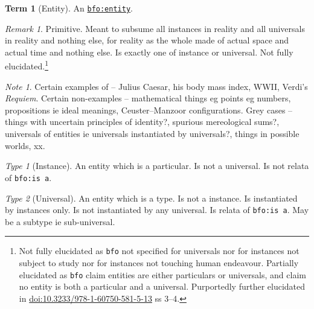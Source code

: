 \documentclass{amsart}%
\newcommand{\code}[1]{\texttt{#1}}%
\newcommand{\titleit}[1]{\textit{#1}}%
\theoremstyle{plain}
\theoremstyle{definition}
\theoremstyle{remark}
\newtheorem*{note}{Note}
\theoremstyle{definition}
\newtheorem{term}{Term}[subsection]%
\theoremstyle{remark}
\newtheorem*{term-type}{Type}
\newtheorem*{term-note}{Remark}
\begin{document}
\begin{term}[Entity]
\label{term:entity}
An \href{http://purl.obolibrary.org/obo/BFO_0000001}{\code{bfo:entity}}.
\begin{term-note}
Primitive. Meant to subsume all instances in reality %
and all universals in reality and nothing else, for reality as the whole made of actual space and actual time and nothing else. Is exactly one of instance or universal. Not fully elucidated.\footnote{Not fully elucidated as \code{bfo} not specified for universals nor for instances not subject to study nor for instances not touching human endeavour. %
%
%
Partially elucidated as \code{bfo} claim entities are either particulars or universals, and claim no entity is both a particular and a universal. Purportedly further elucidated in \href{https://doi.org/10.3233/978-1-60750-581-5-13}{doi:10.3233/978-1-60750-581-5-13} ss 3--4.}
\end{term-note}
\begin{note}
Certain examples of -- Julius Caesar, his body mass index, WWII, Verdi's \titleit{Requiem}. Certain non-examples -- mathematical things eg points eg numbers, propositions ie ideal meanings, Ceuster--Manzoor configurations. Grey cases -- things with uncertain principles of identity?, spurious mereological sums?, universals of entities ie universals instantiated by universals?, things in possible worlds, xx.%
\end{note}
\begin{term-type}[Instance]
An entity which is a particular. Is not a universal. Is not relata of \code{bfo:is a}.
\end{term-type}
\begin{term-type}[Universal]
An entity which is a type. Is not a instance. Is instantiated by instances only. Is not instantiated by any universal. Is relata of \code{bfo:is a}. May be a subtype ie sub-universal.%
\end{term-type}
\end{term}
%
%
%
%
%
\end{document}

